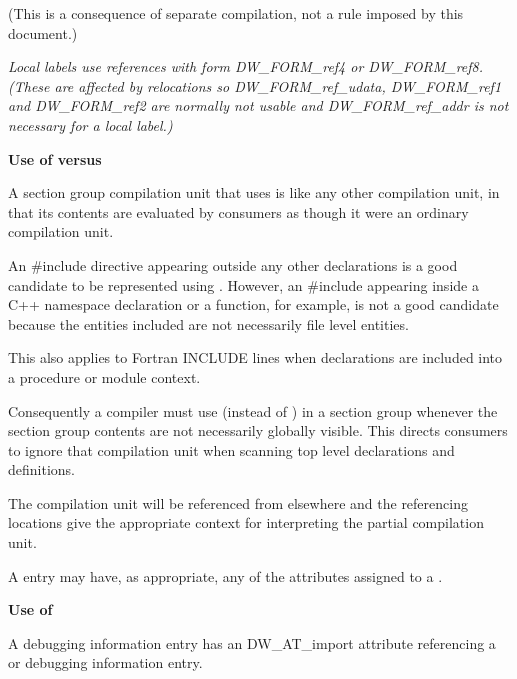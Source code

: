 (This is a consequence of separate compilation, not a rule
imposed by this document.)

\textit{Local labels use references with form DW\-\_FORM\-\_ref4
or 
DW\-\_FORM\-\_ref8. 
(These are affected by relocations
so 
DW\-\_FORM\-\_ref\-\_udata, 
DW\-\_FORM\-\_ref1 and 
DW\-\_FORM\-\_ref2 are
normally not usable and 
DW\-\_FORM\-\_ref\-\_addr is not necessary
for a local label.)}

\textbf{Use of  versus 
}

A section group compilation unit that uses 
is like any other compilation unit, in that its contents
are evaluated by consumers as though it were an ordinary
compilation unit.

An \#include directive appearing outside any other
declarations is a good candidate to be represented using
. 
However, an \#include appearing inside
a C++ namespace declaration or a function, for example, is
not a good candidate because the entities included are not
necessarily file level entities.

This also applies to Fortran INCLUDE lines when declarations
are included into a procedure or module context.

Consequently a compiler must use  (instead
of ) in a section group whenever the section
group contents are not necessarily globally visible. This
directs consumers to ignore that compilation unit when scanning
top level declarations and definitions.

The  compilation unit will be referenced
from elsewhere and the referencing locations give the
appropriate context for interpreting the partial compilation
unit.

A  entry may have, as appropriate, any of
the attributes assigned to a .


\textbf{Use of }

A  debugging information entry has an
DW\-\_AT\-\_import attribute referencing a  or
 debugging information entry.

